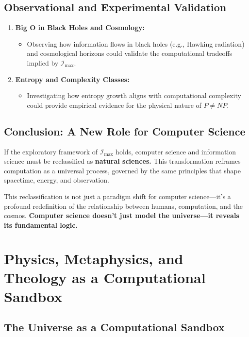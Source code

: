 \documentclass[12pt]{article}
\begin{document}
\subsection{Observational and Experimental Validation}

\begin{enumerate}
    \item \textbf{Big O in Black Holes and Cosmology:}
    \begin{itemize}
        \item Observing how information flows in black holes (e.g., Hawking radiation) and cosmological horizons could validate the computational tradeoffs implied by $\mathcal{I}_{\text{max}}$.
    \end{itemize}

    \item \textbf{Entropy and Complexity Classes:}
    \begin{itemize}
        \item Investigating how entropy growth aligns with computational complexity could provide empirical evidence for the physical nature of $P \neq NP$.
    \end{itemize}
\end{enumerate}

\subsection{Conclusion: A New Role for Computer Science}

If the exploratory framework of $\mathcal{I}_{\text{max}}$ holds, computer science and information science must be reclassified as \textbf{natural sciences.} This transformation reframes computation as a universal process, governed by the same principles that shape spacetime, energy, and observation.

This reclassification is not just a paradigm shift for computer science—it’s a profound redefinition of the relationship between humans, computation, and the cosmos. \textbf{Computer science doesn’t just model the universe—it reveals its fundamental logic.}


\section{Physics, Metaphysics, and Theology as a Computational Sandbox}

\subsection{The Universe as a Computational Sandbox}
\end{document}
